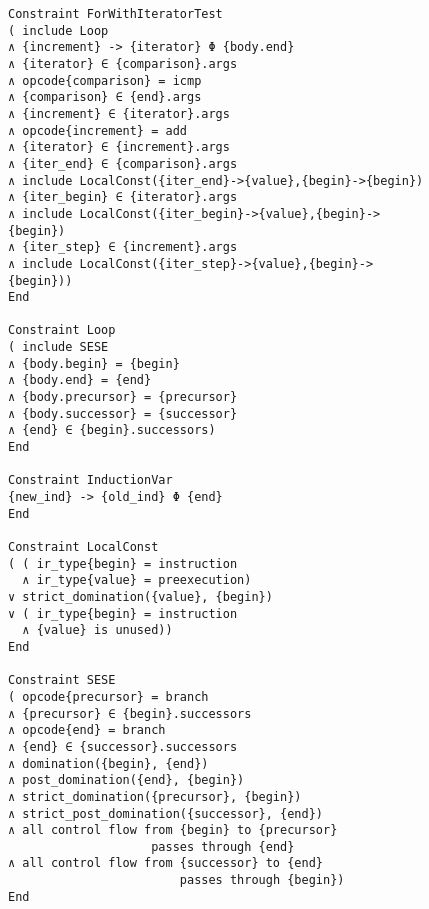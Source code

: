 \begin{figure}[p]
\begin{lstlisting}[language=IDL,basicstyle=\linespread{0.8}\small\ttfamily,
                   firstnumber=263]
Constraint ForWithIteratorTest
( include Loop
∧ {increment} -> {iterator} Φ {body.end}
∧ {iterator} ∈ {comparison}.args
∧ opcode{comparison} = icmp
∧ {comparison} ∈ {end}.args
∧ {increment} ∈ {iterator}.args
∧ opcode{increment} = add
∧ {iterator} ∈ {increment}.args
∧ {iter_end} ∈ {comparison}.args
∧ include LocalConst({iter_end}->{value},{begin}->{begin})
∧ {iter_begin} ∈ {iterator}.args
∧ include LocalConst({iter_begin}->{value},{begin}->{begin})
∧ {iter_step} ∈ {increment}.args
∧ include LocalConst({iter_step}->{value},{begin}->{begin}))
End

Constraint Loop
( include SESE
∧ {body.begin} = {begin}
∧ {body.end} = {end}
∧ {body.precursor} = {precursor}
∧ {body.successor} = {successor}
∧ {end} ∈ {begin}.successors)
End

Constraint InductionVar
{new_ind} -> {old_ind} Φ {end}
End

Constraint LocalConst
( ( ir_type{begin} = instruction
  ∧ ir_type{value} = preexecution)
∨ strict_domination({value}, {begin})
∨ ( ir_type{begin} = instruction
  ∧ {value} is unused))
End

Constraint SESE
( opcode{precursor} = branch
∧ {precursor} ∈ {begin}.successors
∧ opcode{end} = branch
∧ {end} ∈ {successor}.successors
∧ domination({begin}, {end})
∧ post_domination({end}, {begin})
∧ strict_domination({precursor}, {begin})
∧ strict_post_domination({successor}, {end})
∧ all control flow from {begin} to {precursor}
                    passes through {end}
∧ all control flow from {successor} to {end}
                        passes through {begin})
End
\end{lstlisting}
\end{figure}
